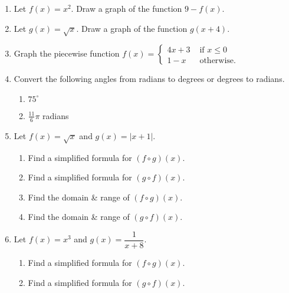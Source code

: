 \documentclass[11pt]{article}
\newcommand{\ds}{\displaystyle}
\begin{document}
\begin{enumerate}
\setcounter{enumi}{\theenumCount}
\item Let $f(x) = x^2$. Draw a graph of the function $9-f(x)$. 
\vfill
\vfill

\item Let $g(x) = \sqrt{x}$. Draw a graph of the function $g(x+4)$.  
\vfill
\vfill

\item Graph the piecewise function $\ds f(x) = \begin{cases} 
4x+3 & \text{ if } x \le 0 \\
1-x & \text{ otherwise.}
\end{cases}$
\vfill

\item Convert the following angles from radians to degrees or degrees to radians.
\begin{multicols}{2}
\begin{enumerate}
\item $75^\circ$
\item $\tfrac{11}{6} \pi$ radians
\end{enumerate}
\end{multicols}
\vfill


\newpage
\item Let $f(x) = \sqrt{x}$ and $g(x) = |x+1|$.
\begin{multicols}{2}
\begin{enumerate}
\item Find a simplified formula for $(f \circ g)(x)$.
\item Find a simplified formula for $(g \circ f)(x)$.
\end{enumerate}
\end{multicols}
\vfill

\begin{multicols}{2}
\begin{enumerate}
\setcounter{enumii}{2}
\item Find the domain \& range of $(f \circ g)(x)$.
\item Find the domain \& range of $(g \circ f)(x)$.
\end{enumerate}
\end{multicols}
\vfill


\item Let $f(x) = x^3$ and $g(x) = \dfrac{1}{x+8}$.
\begin{multicols}{2}
\begin{enumerate}
\item Find a simplified formula for $(f \circ g)(x)$.
\item Find a simplified formula for $(g \circ f)(x)$.
\end{enumerate}
\end{multicols}
\vfill


\end{enumerate}
\end{document}
